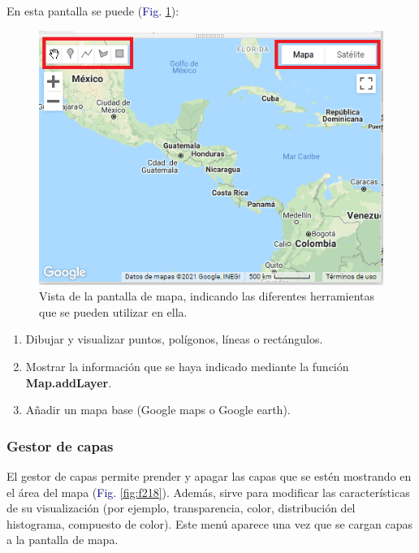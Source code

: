 \documentclass[
  12pt,
  letterpaper,
  twoside]{book}
\providecommand{\tightlist}{%
  \setlength{\itemsep}{0pt}\setlength{\parskip}{0pt}}
\newcommand\boldpurple[1]{\textcolor{darkpurple}{\textbf{#1}}}
\begin{document}
En esta pantalla se puede (\textcolor{darkblue}{Fig.} \ref{fig:f217}):

\begin{figure}[H]

{\centering \includegraphics[width=0.95\linewidth]{Img/drawing} 

}

\caption{Vista de la pantalla de mapa, indicando las diferentes herramientas que se pueden utilizar en ella.}\label{fig:f217}
\end{figure}

\begin{enumerate}
\def\labelenumi{\arabic{enumi}.}
\tightlist
\item
  Dibujar y visualizar puntos, polígonos, líneas o rectángulos.
\item
  Mostrar la información que se haya indicado mediante la función \boldpurple{Map.addLayer}.
\item
  Añadir un mapa base (Google maps o Google earth).
\end{enumerate}

\hypertarget{gestor-de-capas}{%
\subsubsection*{Gestor de capas}\label{gestor-de-capas}}

El gestor de capas permite prender y apagar las capas que se estén mostrando en el área del mapa (\textcolor{darkblue}{Fig.} \ref{fig:f218}). Además, sirve para modificar las características de su visualización (por ejemplo, transparencia, color, distribución del histograma, compuesto de color). Este menú aparece una vez que se cargan capas a la pantalla de mapa.
\end{document}
